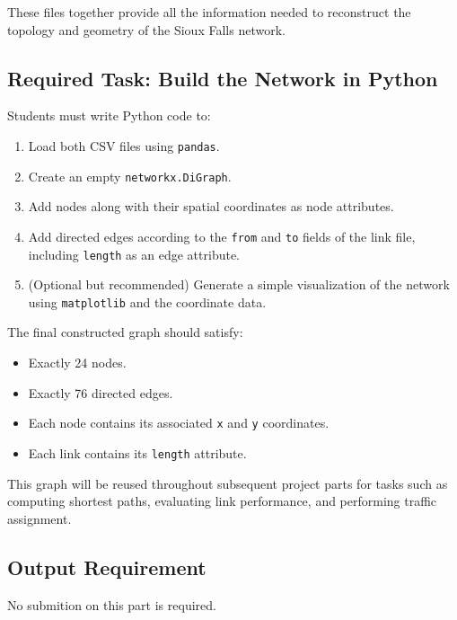 \documentclass{rapportCS} %
\begin{document}
These files together provide all the information needed to reconstruct the topology and geometry of the Sioux Falls network.


\subsection{Required Task: Build the Network in Python}

Students must write Python code to:

\begin{enumerate}
    \item Load both CSV files using \texttt{pandas}.
    \item Create an empty \texttt{networkx.DiGraph}.
    \item Add nodes along with their spatial coordinates as node attributes.
    \item Add directed edges according to the \texttt{from} and \texttt{to} fields of the link file, including \texttt{length} as an edge attribute.
    \item (Optional but recommended) Generate a simple visualization of the network using \texttt{matplotlib} and the coordinate data.
\end{enumerate}

The final constructed graph should satisfy:
\begin{itemize}
    \item Exactly 24 nodes.
    \item Exactly 76 directed edges.
    \item Each node contains its associated \texttt{x} and \texttt{y} coordinates.
    \item Each link contains its \texttt{length} attribute.
\end{itemize}

This graph will be reused throughout subsequent project parts for tasks such as computing shortest paths, evaluating link performance, and performing traffic assignment.

\subsection{Output Requirement}
No submition on this part is required.


%
% 
\end{document}
